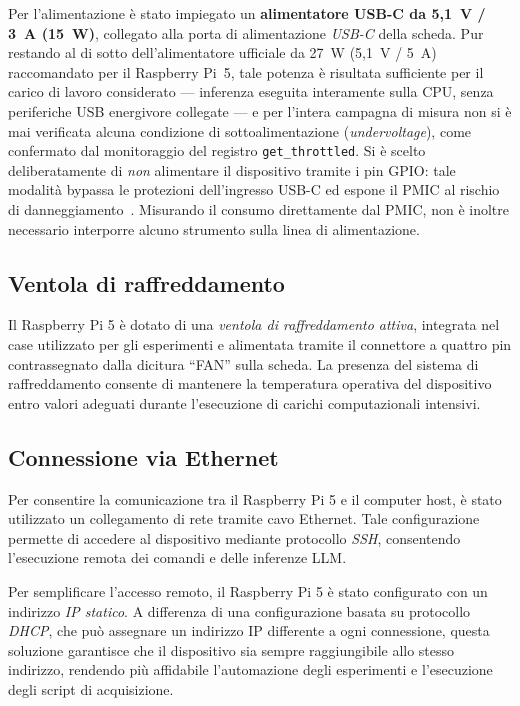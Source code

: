 Per l'alimentazione è stato impiegato un \textbf{alimentatore USB-C da 5,1~V /
3~A (15~W)}, collegato alla porta di alimentazione \textit{USB-C} della scheda. Pur
restando al di sotto dell'alimentatore ufficiale da 27~W (5,1~V / 5~A) raccomandato
per il Raspberry Pi~5, tale potenza è risultata sufficiente per il carico di lavoro
considerato --- inferenza eseguita interamente sulla CPU, senza periferiche USB
energivore collegate --- e per l'intera campagna di misura non si è mai verificata
alcuna condizione di sottoalimentazione (\textit{undervoltage}), come confermato dal
monitoraggio del registro \texttt{get\_throttled}. Si è scelto deliberatamente di \emph{non} alimentare il dispositivo
tramite i pin GPIO: tale modalità bypassa le protezioni dell'ingresso USB-C ed
espone il PMIC al rischio di danneggiamento~\cite{raspberrypi_gpio}. Misurando il
consumo direttamente dal PMIC, non è inoltre necessario interporre alcuno
strumento sulla linea di alimentazione.

\subsection{Ventola di raffreddamento}
Il Raspberry Pi 5 è dotato di una \textit{ventola di raffreddamento attiva},
integrata nel case utilizzato per gli esperimenti e alimentata tramite il
connettore a quattro pin contrassegnato dalla dicitura ``FAN'' sulla scheda.
La presenza del sistema di raffreddamento consente di mantenere la temperatura
operativa del dispositivo entro valori adeguati durante l'esecuzione di carichi
computazionali intensivi.

\subsection{Connessione via Ethernet}

Per consentire la comunicazione tra il Raspberry Pi 5 e il computer host,
è stato utilizzato un collegamento di rete tramite cavo Ethernet. Tale
configurazione permette di accedere al dispositivo mediante protocollo \textit{SSH},
consentendo l'esecuzione remota dei comandi e delle inferenze LLM.\@

Per semplificare l'accesso remoto, il Raspberry Pi 5 è stato configurato con un
indirizzo \textit{IP statico}. A differenza di una configurazione basata su protocollo
\textit{DHCP}, che può assegnare un indirizzo IP differente a ogni connessione,
questa soluzione garantisce che il dispositivo sia sempre raggiungibile allo stesso
indirizzo, rendendo più affidabile l'automazione degli esperimenti e l'esecuzione degli
script di acquisizione.

